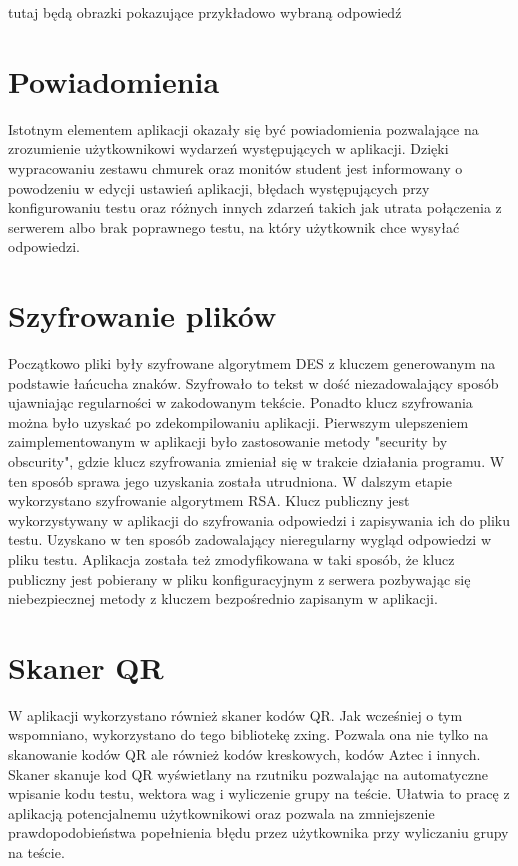 \documentclass{report}
\begin{document}
		tutaj będą obrazki pokazujące przykładowo wybraną odpowiedź\\
		
		\section{Powiadomienia}
		
		Istotnym elementem aplikacji okazały się być powiadomienia pozwalające na zrozumienie użytkownikowi wydarzeń występujących w aplikacji. Dzięki wypracowaniu zestawu chmurek oraz monitów student jest informowany o powodzeniu w edycji ustawień aplikacji, błędach występujących przy konfigurowaniu testu oraz różnych innych zdarzeń takich jak utrata połączenia z serwerem albo brak poprawnego testu, na który użytkownik chce wysyłać odpowiedzi.
		
	
		\section{Szyfrowanie plików}
	
		Początkowo pliki były szyfrowane algorytmem DES z kluczem generowanym na podstawie łańcucha znaków. Szyfrowało to tekst w dość niezadowalający sposób ujawniając regularności w zakodowanym tekście. Ponadto klucz szyfrowania można było uzyskać po zdekompilowaniu aplikacji. Pierwszym ulepszeniem zaimplementowanym w aplikacji było zastosowanie metody "security by obscurity", gdzie klucz szyfrowania zmieniał się w trakcie działania programu. W ten sposób sprawa jego uzyskania została utrudniona.
		W dalszym etapie wykorzystano szyfrowanie algorytmem RSA. Klucz publiczny jest wykorzystywany w aplikacji do szyfrowania odpowiedzi i zapisywania ich do pliku testu. Uzyskano w ten sposób zadowalający nieregularny wygląd odpowiedzi w pliku testu. Aplikacja została też zmodyfikowana w taki sposób, że klucz publiczny jest pobierany w pliku konfiguracyjnym z serwera pozbywając się niebezpiecznej metody z kluczem bezpośrednio zapisanym w aplikacji.
	
		\section{Skaner QR}
		
		W aplikacji wykorzystano również skaner kodów QR. Jak wcześniej o tym wspomniano, wykorzystano do tego bibliotekę zxing. Pozwala ona nie tylko na skanowanie kodów QR ale również kodów kreskowych, kodów Aztec i innych. Skaner skanuje kod QR wyświetlany na rzutniku pozwalając na automatyczne wpisanie kodu testu, wektora wag i wyliczenie grupy na teście. Ułatwia to pracę z aplikacją potencjalnemu użytkownikowi oraz pozwala na zmniejszenie prawdopodobieństwa popełnienia błędu przez użytkownika przy wyliczaniu grupy na teście.
		
\end{document}
